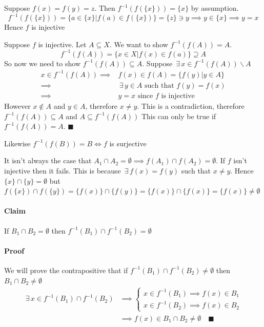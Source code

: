 \documentclass{article}
\newcommand{\E}{\,\exists\,}
\begin{document}
Suppose \(f(x)=f(y)=z\). Then \(f^{-1}(f(\{x\}))=\{x\}\) by assumption.
\[f^{-1}(f(\{x\}))=\{a\in \{x\}|f(a)\in f(\{x\})\}=\{z\}\ni y\implies y\in\{x\}\implies y=x\]
Hence \(f\) is injective

Suppose \(f\) is injective. Let \(A\subseteq X\). We want to show \(f^{-1}(f(A))=A\).
\[f^{-1}(f(A))=\{x\in X|f(x)\in f(a)\}\supseteq A\]
So now we need to show \(f^{-1}(f(A))\subseteq A\). Suppose \(\E x\in f^{-1}(f(A))\backslash A\)
\begin{align*}
x\in f^{-1}(f(A))\implies &f(x)\in f(A)=\{f(y)|y\in A\}\\
\implies &\E y\in A\text{ such that }f(y)=f(x)\\
\implies &y=x\text{ since \(f\) is injective}
\end{align*}
However \(x\not\in A\) and \(y\in A\), therefore \(x\ne y\). This is a contradiction, therefore \(f^{-1}(f(A))\subseteq A\) and \(A\subseteq f^{-1}(f(A))\) This can only be true if \(f^{-1}(f(A))=A\). \(\blacksquare\)

Likewise \(f^{-1}(f(B))=B\iff f\) is surjective

It isn't always the case that \(A_1\cap A_2=\emptyset\implies f(A_1)\cap f(A_2)=\emptyset\). If \(f\) isn't injective then it fails. This is because \(\E f(x)=f(y)\) such that \(x\ne y\). Hence \(\{x\}\cap\{y\}=\emptyset\) but \(f(\{x\})\cap f(\{y\})=\{f(x)\}\cap \{f(y)\}=\{f(x)\}\cap \{f(x)\}=\{f(x)\}\ne\emptyset\)

\paragraph{Claim} If \(B_1\cap B_2=\emptyset\) then \(f^{-1}(B_1)\cap f^{-1}(B_2)=\emptyset\)

\paragraph{Proof} We will prove the contrapositive that if \(f^{-1}(B_1)\cap f^{-1}(B_2)\ne\emptyset\) then \(B_1\cap B_2\ne\emptyset\)
\begin{align*}
\E x\in f^{-1}(B_1)\cap f^{-1}(B_2)&\implies\left\{
\begin{array}{l}
x\in f^{-1}(B_1)\implies f(x)\in B_1\\
x\in f^{-1}(B_2)\implies f(x)\in B_2
\end{array}
\right.\\
&\implies f(x)\in B_1\cap B_2\ne\emptyset\quad\blacksquare
\end{align*}
\end{document}
